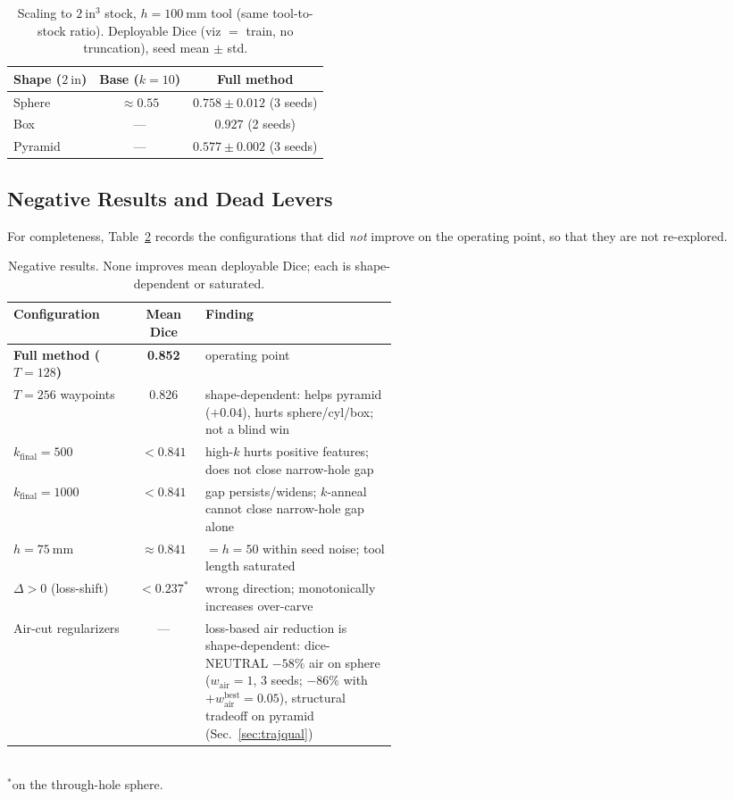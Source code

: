 \begin{table}[t]
  \centering
  \caption{Scaling to $2~\mathrm{in}^3$ stock, $h{=}100~\mathrm{mm}$ tool (same tool-to-stock ratio). Deployable Dice (viz $=$ train, no truncation), seed mean $\pm$ std.}
  \label{tab:scaling}
  \small
  \begin{tabular}{lcc}
    \toprule
    Shape ($2~\mathrm{in}$) & Base ($k{=}10$) & Full method \\
    \midrule
    Sphere   & $\approx 0.55$ & $0.758 \pm 0.012$ (3 seeds) \\
    Box      & ---            & $0.927$ (2 seeds) \\
    Pyramid  & ---            & $0.577 \pm 0.002$ (3 seeds) \\
    \bottomrule
  \end{tabular}
\end{table}

\subsection{Negative Results and Dead Levers}
\label{sec:negative}

For completeness, Table~\ref{tab:negative} records the configurations that did
\emph{not} improve on the operating point, so that they are not re-explored.

\begin{table}[t]
  \centering
  \caption{Negative results. None improves mean deployable Dice; each is shape-dependent or saturated.}
  \label{tab:negative}
  \small
  \begin{tabular}{lc p{0.5\linewidth}}
    \toprule
    Configuration & Mean Dice & Finding \\
    \midrule
    \textbf{Full method ($T{=}128$)} & \textbf{0.852} & operating point \\
    $T{=}256$ waypoints             & 0.826 & shape-dependent: helps pyramid ($+0.04$), hurts sphere/cyl/box; not a blind win \\
    $k_{\mathrm{final}}{=}500$      & $<0.841$ & high-$k$ hurts positive features; does not close narrow-hole gap \\
    $k_{\mathrm{final}}{=}1000$     & $<0.841$ & gap persists/widens; $k$-anneal cannot close narrow-hole gap alone \\
    $h{=}75~\mathrm{mm}$            & $\approx 0.841$ & $= h{=}50$ within seed noise; tool length saturated \\
    $\Delta > 0$ (loss-shift)       & $<0.237^*$ & wrong direction; monotonically increases over-carve \\
    Air-cut regularizers            & --- & loss-based air reduction is shape-dependent: dice-NEUTRAL $-58\%$ air on sphere ($w_{\mathrm{air}}{=}1$, 3 seeds; $-86\%$ with $+w^{\mathrm{best}}_{\mathrm{air}}{=}0.05$), structural tradeoff on pyramid (Sec.~\ref{sec:trajqual}) \\
    \bottomrule
  \end{tabular}\\
  \small $^*$on the through-hole sphere.
\end{table}

